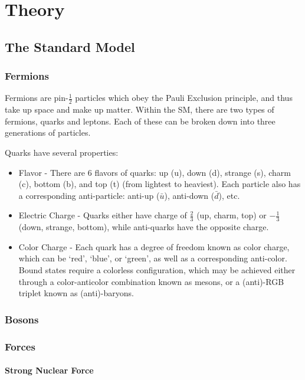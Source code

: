 \chapter{Theory}
    \section{The Standard Model}

        \subsection{Fermions}
        Fermions are pin-$\frac{1}{2}$ particles which obey the Pauli Exclusion principle, and thus take up space and make up matter. Within the \gls{SM}, there are two types of fermions, quarks and leptons. Each of these can be broken down into three generations of particles.

        Quarks have several properties:
        \begin{itemize}
            \item Flavor - There are 6 flavors of quarks: up (u), down (d), strange (s), charm (c), bottom (b), and top (t) (from lightest to heaviest). Each particle also has a corresponding anti-particle: anti-up ($\bar{u}$), anti-down ($\bar{d}$), etc.
            \item Electric Charge - Quarks either have charge of $\frac{2}{3}$ (up, charm, top) or $-\frac{1}{3}$ (down, strange, bottom), while anti-quarks have the opposite charge. 
            \item Color Charge - Each quark has a degree of freedom known as color charge, which can be `red', `blue', or `green', as well as a corresponding anti-color. Bound states require a colorless configuration, which may be achieved either through a color-anticolor combination known as mesons, or a (anti)-RGB triplet known as (anti)-baryons.
        \end{itemize}


        \subsection{Bosons}


\subsection{Forces}
\subsubsection{Strong Nuclear Force}
